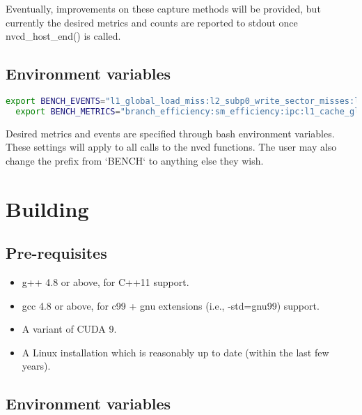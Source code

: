 \documentclass[8pt, a4paper, twoside, twoclumn, english]{extreport}
\begin{document}
\begin{flushleft}
Eventually, improvements on these capture methods will be provided, but currently the desired metrics and
counts are reported to stdout once nvcd\_host\_end() is called.
\end{flushleft}

\subsection{Environment variables}

\begin{lstlisting}[language=bash, caption=Specifying metrics and event counters through environment variables]
  export BENCH_EVENTS="l1_global_load_miss:l2_subp0_write_sector_misses:l2_subp0_read_sector_misses:active_warps:branch:divergent_branch"
  export BENCH_METRICS="branch_efficiency:sm_efficiency:ipc:l1_cache_global_hit_rate:dram_read_throughput:dram_write_throughput"
\end{lstlisting}

\begin{flushleft}
  Desired metrics and events are specified through bash environment variables. These settings will apply
  to all calls to the nvcd functions. The user may also change the prefix from `BENCH` to anything else they wish.
\end{flushleft}

\section {Building}

\subsection {Pre-requisites}

\begin{itemize}
\item g++ 4.8 or above, for C++11 support.
\item gcc 4.8 or above, for c99 + gnu extensions (i.e., -std=gnu99) support.
\item A variant of CUDA 9.
\item A Linux installation which is reasonably up to date (within the last few years).
\end{itemize}

\subsection{Environment variables}
\end{document}
